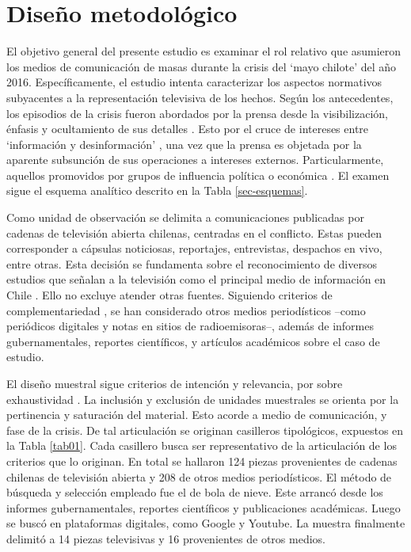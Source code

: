 \documentclass{textolivre}
\begin{document}
\section{Diseño metodológico}\label{sec-deseno}
El objetivo general del presente estudio es examinar el rol relativo que asumieron
los medios de comunicación de masas durante la crisis del ‘mayo chilote’ del año 2016.
Específicamente, el estudio intenta caracterizar los aspectos normativos subyacentes a la
representación televisiva de los hechos. Según los antecedentes, los episodios de la crisis
fueron abordados por la prensa desde la visibilización, énfasis y ocultamiento de sus
detalles \cite{cabello2018,ValdebenitoAllendes2018}. Esto por el cruce
de intereses entre ‘información y desinformación’ \cite{cardenas2019,Santander2014,sapiezynska2013}, 
una vez que la prensa es objetada por
la aparente subsunción de sus operaciones a intereses externos. Particularmente,
aquellos promovidos por grupos de influencia política o económica \cite{Habermas2006,Luhmann2007}. 
El examen sigue el esquema analítico descrito en la Tabla \ref{sec-esquemas}.

Como unidad de observación se delimita a comunicaciones publicadas por cadenas
de televisión abierta chilenas, centradas en el conflicto. Estas pueden corresponder a
cápsulas noticiosas, reportajes, entrevistas, despachos en vivo, entre otras. Esta decisión
se fundamenta sobre el reconocimiento de diversos estudios que señalan a la televisión
como el principal medio de información en Chile \cite{newman2019}. Ello no excluye
atender otras fuentes. Siguiendo criterios de complementariedad \cite{strauss2002}, 
se han considerado otros medios periodísticos --como periódicos digitales y notas
en sitios de radioemisoras--, además de informes gubernamentales, reportes científicos,
y artículos académicos sobre el caso de estudio.

El diseño muestral sigue criterios de intención y relevancia, por sobre exhaustividad
\cite{MartnezSalgado2012}. La inclusión y exclusión de unidades muestrales se
orienta por la pertinencia y saturación del material. Esto acorde a medio de comunicación,
y fase de la crisis. De tal articulación se originan casilleros tipológicos, expuestos en la
Tabla \ref{tab01}. Cada casillero busca ser representativo de la articulación de los criterios que lo
originan. En total se hallaron 124 piezas provenientes de cadenas chilenas de televisión
abierta y 208 de otros medios periodísticos. El método de búsqueda y selección
empleado fue el de bola de nieve. Este arrancó desde los informes gubernamentales,
reportes científicos y publicaciones académicas. Luego se buscó en plataformas digitales,
como Google y Youtube. La muestra finalmente delimitó a 14 piezas televisivas y 16
provenientes de otros medios.
\end{document}
